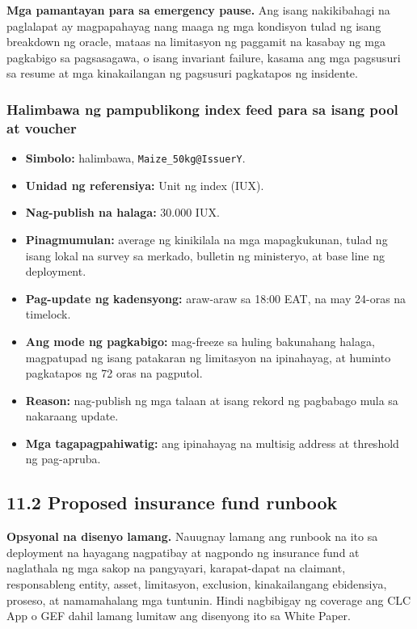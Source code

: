 \documentclass[11pt]{article}
\begin{document}
\textbf{Mga pamantayan para sa emergency pause.} Ang isang nakikibahagi na paglalapat ay magpapahayag nang maaga ng mga kondisyon tulad ng isang breakdown ng oracle, mataas na limitasyon ng paggamit na kasabay ng mga pagkabigo sa pagsasagawa, o isang invariant failure, kasama ang mga pagsusuri sa resume at mga kinakailangan ng pagsusuri pagkatapos ng insidente.

\subsubsection*{Halimbawa ng pampublikong index feed para sa isang pool at voucher}

\begin{itemize}[leftmargin=*]
\item \textbf{Simbolo:} halimbawa, \texttt{Maize\_50kg@IssuerY}.
\item \textbf{Unidad ng referensiya:} Unit ng index (IUX).
\item \textbf{Nag-publish na halaga:} 30.000 IUX.
\item \textbf{Pinagmumulan:} average ng kinikilala na mga mapagkukunan, tulad ng isang lokal na survey sa merkado, bulletin ng ministeryo, at base line ng deployment.
\item \textbf{Pag-update ng kadensyong:} araw-araw sa 18:00 EAT, na may 24-oras na timelock.
\item \textbf{Ang mode ng pagkabigo:} mag-freeze sa huling bakunahang halaga, magpatupad ng isang patakaran ng limitasyon na ipinahayag, at huminto pagkatapos ng 72 oras na pagputol.
\item \textbf{Reason:} nag-publish ng mga talaan at isang rekord ng pagbabago mula sa nakaraang update.
\item \textbf{Mga tagapagpahiwatig:} ang ipinahayag na multisig address at threshold ng pag-apruba.
\end{itemize}
\subsection*{11.2 Proposed insurance fund runbook}

\textbf{Opsyonal na disenyo lamang.} Nauugnay lamang ang runbook na ito sa deployment na hayagang nagpatibay at nagpondo ng insurance fund at naglathala ng mga sakop na pangyayari, karapat-dapat na claimant, responsableng entity, asset, limitasyon, exclusion, kinakailangang ebidensiya, proseso, at namamahalang mga tuntunin. Hindi nagbibigay ng coverage ang CLC App o GEF dahil lamang lumitaw ang disenyong ito sa White Paper.
\end{document}
